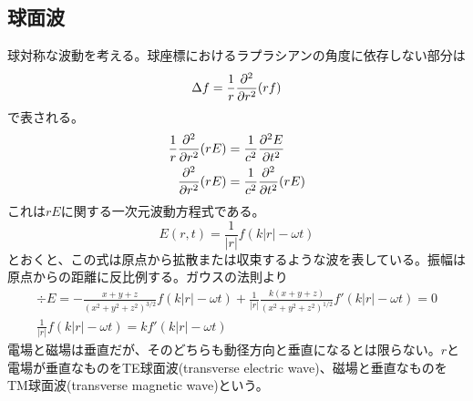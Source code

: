 \subsection{球面波}
    球対称な波動を考える。球座標におけるラプラシアンの角度に依存しない部分は
        \[\Delta f = \frac{1}{r}\pd[^2]{r^2}(rf)\]
    で表される。
    \begin{align*}
        \frac{1}{r}\pd[^2]{r^2}(rE) &= \frac{1}{c^2}\pd[^2E]{t^2}\\
        \pd[^2]{r^2}(rE) &= \frac{1}{c^2}\pd[^2]{t^2}(rE)
    \end{align*}
    これは$rE$に関する一次元波動方程式である。
        \[E(r, t) = \frac{1}{|r|}{f(k|r| - \omega t)}\]
    とおくと、この式は原点から拡散または収束するような波を表している。振幅は原点からの距離に反比例する。ガウスの法則より
    \begin{gather*}
        \div E = -\frac{x + y + z}{(x^2 + y^2 + z^2)^{3/2}}f(k|r| - \omega t) + \frac{1}{|r|}\frac{k(x + y + z)}{(x^2 + y^2 + z^2)^{1/2}}f'(k|r| - \omega t) = 0\\
        \frac{1}{|r|}f(k|r| - \omega t) = kf'(k|r| - \omega t)
    \end{gather*}
    電場と磁場は垂直だが、そのどちらも動径方向と垂直になるとは限らない。$r$と電場が垂直なものをTE球面波(transverse electric wave)、磁場と垂直なものをTM球面波(transverse magnetic wave)という。

